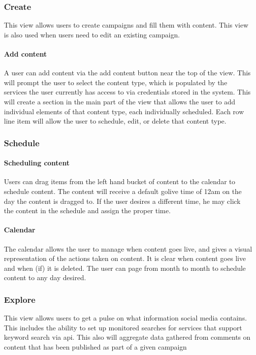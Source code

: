 \documentclass{article}
\begin{document}
        \subsubsection{Create}
        This view allows users to create campaigns and fill them with content.  This view is also used when users need to edit an existing campaign.
        \paragraph{Add content}
        A user can add content via the add content button near the top of the view.  This will prompt the user to select the content type, which is populated by the services the user currently has access to via credentials stored in the system. This will create a section in the main part of the view that allows the user to add individual elements of that content type, each individually scheduled.  Each row line item will allow the user to schedule, edit, or delete that content type.
        \subsubsection{Schedule}
        \paragraph{Scheduling content}
        Users can drag items from the left hand bucket of content to the calendar to schedule content.  The content will receive a default golive time of 12am on the day the content is dragged to.  If the user desires a different time, he may click the content in the schedule and assign the proper time.
        \paragraph{Calendar}
        The calendar allows the user to manage when content goes live, and gives a visual representation of the actions taken on content.  It is clear when content goes live and when (if) it is deleted.  The user can page from month to month to schedule content to any day desired.
        \subsubsection{Explore}
        This view allows users to get a pulse on what information social media contains.  This includes the ability to set up monitored searches for services that support keyword search via api.  This also will aggregate data gathered from comments on content that has been published as part of a given campaign
\end{document}
